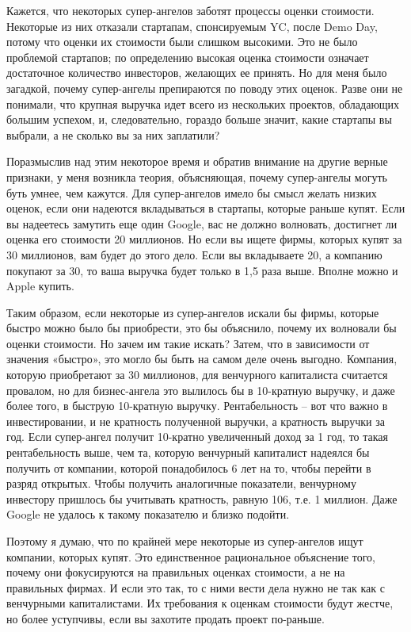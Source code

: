 \documentclass[ebook,12pt,oneside,openany]{memoir}
\begin{document}
Кажется, что некоторых супер-ангелов заботят процессы оценки
стоимости. Некоторые из них отказали стартапам, спонсируемым YC, после
Demo Day, потому что оценки их стоимости были слишком высокими. Это не
было проблемой стартапов; по определению высокая оценка стоимости
означает достаточное количество инвесторов, желающих ее принять. Но
для меня было загадкой, почему супер-ангелы препираются по поводу этих
оценок. Разве они не понимали, что крупная выручка идет всего из
нескольких проектов, обладающих большим успехом, и, следовательно,
гораздо больше значит, какие стартапы вы выбрали, а не сколько вы за
них заплатили?

Поразмыслив над этим некоторое время и обратив внимание на другие
верные признаки, у меня возникла теория, объясняющая, почему
супер-ангелы могуть буть умнее, чем кажутся. Для супер-ангелов имело
бы смысл желать низких оценок, если они надеются вкладываться в
стартапы, которые раньше купят. Если вы надеетесь замутить еще один
Google, вас не должно волновать, достигнет ли оценка его стоимости 20
миллионов. Но если вы ищете фирмы, которых купят за 30 миллионов, вам
будет до этого дело. Если вы вкладываете 20, а компанию покупают за
30, то ваша выручка будет только в 1,5 раза выше. Вполне можно и Apple
купить.

Таким образом, если некоторые из супер-ангелов искали бы фирмы,
которые быстро можно было бы приобрести, это бы объяснило, почему их
волновали бы оценки стоимости. Но зачем им такие искать? Затем, что в
зависимости от значения «быстро», это могло бы быть на самом деле
очень выгодно. Компания, которую приобретают за 30 миллионов, для
венчурного капиталиста считается провалом, но для бизнес-ангела это
вылилось бы в 10-кратную выручку, и даже более того, в быструю
10-кратную выручку. Рентабельность – вот что важно в инвестировании, и
не кратность полученной выручки, а кратность выручки за год. Если
супер-ангел получит 10-кратно увеличенный доход за 1 год, то такая
рентабельность выше, чем та, которую венчурный капиталист надеялся бы
получить от компании, которой понадобилось 6 лет на то, чтобы перейти
в разряд открытых. Чтобы получить аналогичные показатели, венчурному
инвестору пришлось бы учитывать кратность, равную 106, т.е. 1 миллион.
Даже Google не удалось к такому показателю и близко подойти.

Поэтому я думаю, что по крайней мере некоторые из супер-ангелов ищут
компании, которых купят. Это единственное рациональное объяснение
того, почему они фокусируются на правильных оценках стоимости, а не на
правильных фирмах. И если это так, то с ними вести дела нужно не так
как с венчурными капиталистами. Их требования к оценкам стоимости
будут жестче, но более уступчивы, если вы захотите продать проект
по-раньше.
\end{document}

